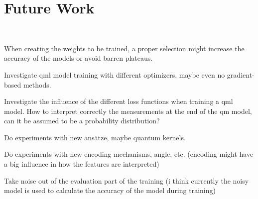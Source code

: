 \chapter{Future Work}\label{chapter:future_work} \

When creating the weights to be trained, a proper selection might increase the accuracy of the models or avoid barren plateaus. \

Investigate \ac{qml} model training with different optimizers, maybe even no gradient-based methods. \

Investigate the influence of the different loss functions when training a \ac{qml} model. How to interpret correctly the measurements at the end of the \ac{qm} model, can it be assumed to be a probability distribution? \

Do experiments with new ansätze, maybe quantum kernels. \

Do experiments with new encoding mechanisms, angle, etc. (encoding might have a big influence in how the features are interpreted) \

Take noise out of the evaluation part of the training (i think currently the noisy model is used to calculate the accuracy of the model during training) \